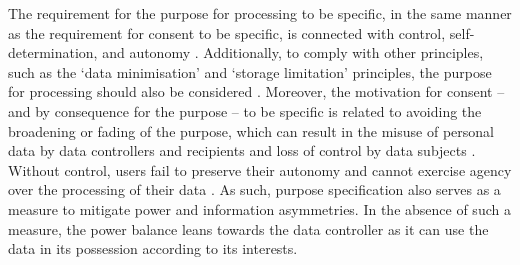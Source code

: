 The requirement for the purpose for processing to be specific, in the same manner as the requirement for consent to be specific, is connected with control, self-determination, and autonomy \citep{koning_purpose_2020}. 
Additionally, to comply with other principles, such as the `data minimisation' and `storage limitation' principles, the purpose for processing should also be considered \citep{koning_purpose_2020}.
Moreover, the motivation for consent -- and by consequence for the purpose -- to be specific is related to avoiding the broadening or fading of the purpose, which can result in the misuse of personal data by data controllers and recipients and loss of control by data subjects \citep{european_data_protection_board_guidelines_2020}.
Without control, users fail to preserve their autonomy and cannot exercise agency over the processing of their data \citep{jarovsky_improving_2018}.
As such, purpose specification also serves as a measure to mitigate power and information asymmetries.
In the absence of such a measure, the power balance leans towards the data controller as it can use the data in its possession according to its interests.

